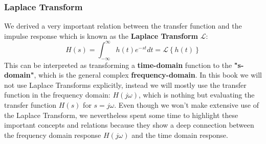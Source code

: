 \subsubsection{Laplace Transform}
 We derived a very important relation between the transfer function and the impulse response which is known as the \textbf{Laplace Transform} $\mathcal{L}$:
    \begin{equation}
        H(s) = \int_{-\infty}^{\infty} h(t) e^{-st} dt = \mathcal{L} \left\{ h(t) \right\}
    \end{equation}
This can be interpreted as transforming a \textbf{time-domain} function to the \textbf{"s-domain"}, which is the general complex \textbf{frequency-domain}.  In this book we will not use Laplace Transforms explicitly, instead we will mostly use the transfer function in the frequency domain:  $H(j\omega)$, which is nothing but evaluating the transfer function $H(s)$ for $s=j\omega$.  
Even though we won't make extensive use of the Laplace Transform, we nevertheless spent some time to highlight these important concepts and relations because they show a deep connection between the frequency domain response $H(j\omega)$ and the time domain response.
